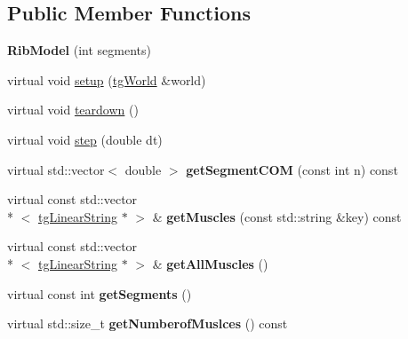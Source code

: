 \subsection*{Public Member Functions}
\begin{DoxyCompactItemize}
\item 
\hypertarget{class_rib_model_a1f6679da96ca628cb67592a158e0f20d}{{\bfseries Rib\-Model} (int segments)}\label{class_rib_model_a1f6679da96ca628cb67592a158e0f20d}

\item 
virtual void \hyperlink{class_rib_model_a4cbc6a0649ca5deb7ab0c98b8ae1ab1e}{setup} (\hyperlink{classtg_world}{tg\-World} \&world)
\item 
virtual void \hyperlink{class_rib_model_a1f44d22a7213cd3042383c56dcbac61f}{teardown} ()
\item 
virtual void \hyperlink{class_rib_model_a71a67cc85f18bf8bf72c82b3e7d8c538}{step} (double dt)
\item 
\hypertarget{class_base_spine_model_learning_afd3d71b99a2105a60c78d52d67068c00}{virtual std\-::vector$<$ double $>$ {\bfseries get\-Segment\-C\-O\-M} (const int n) const }\label{class_base_spine_model_learning_afd3d71b99a2105a60c78d52d67068c00}

\item 
\hypertarget{class_base_spine_model_learning_a0c595346fb7a23e89d9f6ec572a19c49}{virtual const std\-::vector\\*
$<$ \hyperlink{classtg_linear_string}{tg\-Linear\-String} $\ast$ $>$ \& {\bfseries get\-Muscles} (const std\-::string \&key) const }\label{class_base_spine_model_learning_a0c595346fb7a23e89d9f6ec572a19c49}

\item 
\hypertarget{class_base_spine_model_learning_a508eae423b9fd9e194b620563b15b9db}{virtual const std\-::vector\\*
$<$ \hyperlink{classtg_linear_string}{tg\-Linear\-String} $\ast$ $>$ \& {\bfseries get\-All\-Muscles} ()}\label{class_base_spine_model_learning_a508eae423b9fd9e194b620563b15b9db}

\item 
\hypertarget{class_base_spine_model_learning_af38ddf518f0b9d524d869591216070fd}{virtual const int {\bfseries get\-Segments} ()}\label{class_base_spine_model_learning_af38ddf518f0b9d524d869591216070fd}

\item 
\hypertarget{class_base_spine_model_learning_a21c0b6e4c84e4f61b92d803dd677525f}{virtual std\-::size\-\_\-t {\bfseries get\-Numberof\-Muslces} () const }\label{class_base_spine_model_learning_a21c0b6e4c84e4f61b92d803dd677525f}


\end{DoxyCompactItemize}
